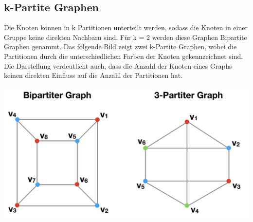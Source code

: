 \subsection{k-Partite Graphen}
Die Knoten können in k Partitionen unterteilt werden, sodass die Knoten in einer Gruppe keine direkten Nachbarn sind.
Für k = 2 werden diese Graphen Bipartite Graphen genammt.
Das folgende Bild zeigt zwei k-Partite Graphen, wobei die Partitionen durch die unterschiedlichen Farben der Knoten gekennzeichnet sind.
Die Darstellung verdeutlicht auch, dass die Anzahl der Knoten eines Graphs keinen direkten Einfluss auf die Anzahl der Partitionen hat.
\begin{center}
	\includegraphics[scale = 0.4]{./images/k_partiter_graph.png}
\end{center}
